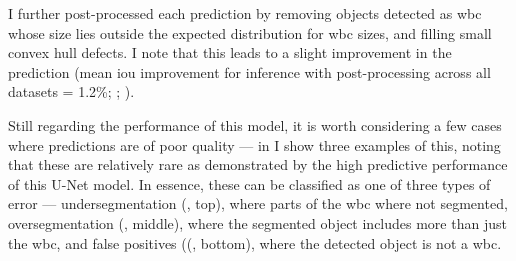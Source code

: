 \begin{figure}[!ht]
    \label{fig:wbc-segmentation-good}
\end{figure}

I further post-processed each prediction by removing objects detected as \ac{wbc} whose size lies outside the expected distribution for \ac{wbc} sizes, and filling small convex hull defects. I note that this leads to a slight improvement in the prediction (mean \ac{iou} improvement for inference with post-processing across all datasets = 1.2\%; ; ). 

\begin{figure}[!ht]
    \label{fig:u-net-post-process}
\end{figure}

Still regarding the performance of this model, it is worth considering a few cases where predictions are of poor quality --- in  I show three examples of this, noting that these are relatively rare as demonstrated by the high predictive performance of this U-Net model. In essence, these can be classified as one of three types of error --- undersegmentation (, top), where parts of the \ac{wbc} where not segmented, oversegmentation (, middle), where the segmented object includes more than just the \ac{wbc}, and false positives ((, bottom), where the detected object is not a \ac{wbc}. 

\begin{figure}[!ht]
    \label{fig:wbc-segmentation-bad}
\end{figure}

